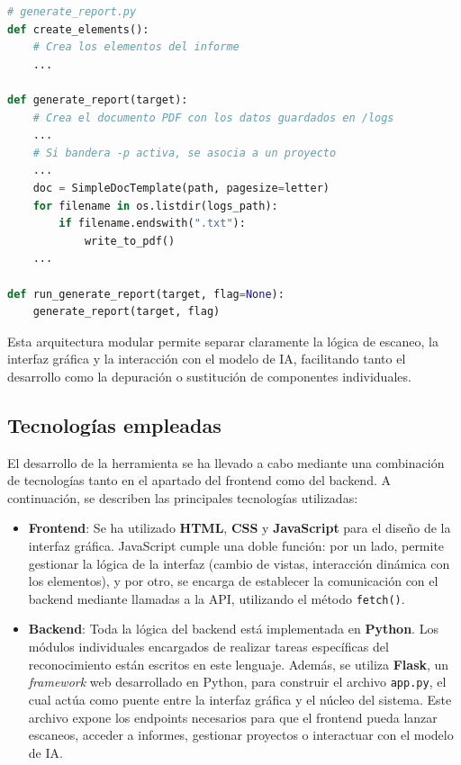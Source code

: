 \begin{parskipenv}
\begin{lstlisting}[language=Python, caption={Pseudocódigo del archivo \textit{generate\_report.py}}]
# generate_report.py
def create_elements():
    # Crea los elementos del informe
    ...

def generate_report(target):
    # Crea el documento PDF con los datos guardados en /logs
    ...
    # Si bandera -p activa, se asocia a un proyecto
    ...
    doc = SimpleDocTemplate(path, pagesize=letter)
    for filename in os.listdir(logs_path):
        if filename.endswith(".txt"):
            write_to_pdf()
    ...

def run_generate_report(target, flag=None):
    generate_report(target, flag)
\end{lstlisting}

Esta arquitectura modular permite separar claramente la lógica de escaneo, la interfaz gráfica y la interacción con el modelo de IA, facilitando tanto el desarrollo como la depuración o sustitución de componentes individuales.

\subsection{Tecnologías empleadas}
El desarrollo de la herramienta se ha llevado a cabo mediante una combinación de tecnologías tanto en el apartado del frontend como del backend. A continuación, se describen las principales tecnologías utilizadas:

\begin{itemize}
    \item \textbf{Frontend}: Se ha utilizado \textbf{HTML}, \textbf{CSS} y \textbf{JavaScript} para el diseño de la interfaz gráfica. JavaScript cumple una doble función: por un lado, permite gestionar la lógica de la interfaz (cambio de vistas, interacción dinámica con los elementos), y por otro, se encarga de establecer la comunicación con el backend mediante llamadas a la API, utilizando el método \texttt{fetch()}.
    
    \item \textbf{Backend}: Toda la lógica del backend está implementada en \textbf{Python}. Los módulos individuales encargados de realizar tareas específicas del reconocimiento están escritos en este lenguaje. Además, se utiliza \textbf{Flask}, un \textit{framework} web desarrollado en Python, para construir el archivo \texttt{app.py}, el cual actúa como puente entre la interfaz gráfica y el núcleo del sistema. Este archivo expone los endpoints necesarios para que el frontend pueda lanzar escaneos, acceder a informes, gestionar proyectos o interactuar con el modelo de IA.
    

\end{itemize}
\end{parskipenv}
